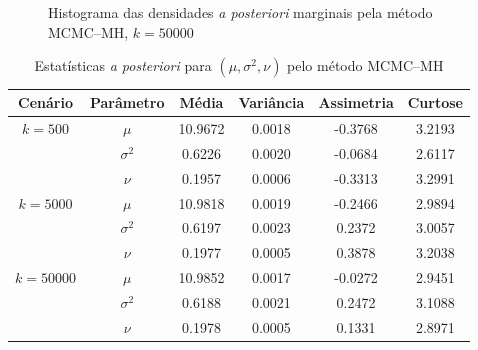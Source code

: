 \documentclass[9pt]{beamer}
\begin{document}
\begin{frame}
\begin{figure}[t]
	\caption{Histograma das densidades \textit{a posteriori} marginais pela método MCMC--MH, $k = 50000$}%
\end{figure}
\end{frame}
\begin{frame}
\begin{table}[htb]
	\caption{Estatísticas \textit{a posteriori} para $(\mu, \sigma^2, \nu)$ pelo método MCMC--MH}
	\label{tab3}
	\centering
	\begin{tabular}{cccccc}
		\toprule
		Cenário & Parâmetro & Média & Variância & Assimetria & Curtose \\
		\midrule
		$k = 500$ & $\mu$ & 10.9672 & 0.0018 & -0.3768 & 3.2193 \\
		& $\sigma^2$ & 0.6226 & 0.0020 & -0.0684 & 2.6117 \\
		& $\nu$      & 0.1957 & 0.0006 & -0.3313 & 3.2991 \\
		\midrule
		$k = 5000$ & $\mu$ & 10.9818 & 0.0019 & -0.2466 & 2.9894 \\
		& $\sigma^2$ & 0.6197 & 0.0023 & 0.2372 & 3.0057 \\
		& $\nu$      & 0.1977 & 0.0005 & 0.3878 & 3.2038 \\
		\midrule
		$k = 50000$ & $\mu$ & 10.9852 & 0.0017 & -0.0272 & 2.9451 \\
		& $\sigma^2$ & 0.6188 & 0.0021 & 0.2472 & 3.1088 \\
		& $\nu$      & 0.1978 & 0.0005 & 0.1331 & 2.8971 \\
		\bottomrule
	\end{tabular}
\end{table}
\end{frame}
\end{document}
